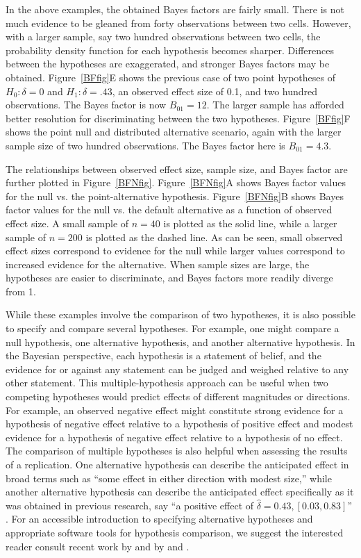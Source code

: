 \documentclass[man]{apa6}
\begin{document}
In the above examples, the obtained Bayes factors are fairly small. There is not much evidence to be gleaned from forty observations between two cells. However, with a larger sample, say two hundred observations between two cells, the probability density function for each hypothesis becomes sharper. Differences between the hypotheses are exaggerated, and stronger Bayes factors may be obtained. Figure~\ref{BFfig}E shows the previous case of two point hypotheses of $H_0: \delta = 0$ and $H_1: \delta = .43$, an observed effect size of 0.1, and two hundred observations. The Bayes factor is now $B_{01} = 12$. The larger sample has afforded better resolution for discriminating between the two hypotheses. Figure~\ref{BFfig}F shows the point null and distributed alternative scenario, again with the larger sample size of two hundred observations. The Bayes factor here is $B_{01} = 4.3$.

The relationships between observed effect size, sample size, and Bayes factor are further plotted in Figure~\ref{BFNfig}. Figure~\ref{BFNfig}A shows Bayes factor values for the null vs. the point-alternative hypothesis. Figure~\ref{BFNfig}B shows Bayes factor values for the null vs. the default alternative as a function of observed effect size. A small sample of $n=40$ is plotted as the solid line, while a larger sample of $n=200$ is plotted as the dashed line. As can be seen, small observed effect sizes correspond to evidence for the null while larger values correspond to increased evidence for the alternative. When sample sizes are large, the hypotheses are easier to discriminate, and Bayes factors more readily diverge from 1.  

While these examples involve the comparison of two hypotheses, it is also possible to specify and compare several hypotheses. For example, one might compare a null hypothesis, one alternative hypothesis, and another alternative hypothesis. In the Bayesian perspective, each hypothesis is a statement of belief, and the evidence for or against any statement can be judged and weighed relative to any other statement. 
This multiple-hypothesis approach can be useful when two competing hypotheses would predict effects of different magnitudes or directions. For example, an observed negative effect might constitute strong evidence for a hypothesis of negative effect relative to a hypothesis of positive effect and modest evidence for a hypothesis of negative effect relative to a hypothesis of no effect. The comparison of multiple hypotheses is also helpful when assessing the results of a replication. One alternative hypothesis can describe the anticipated effect in broad terms such as ``some effect in either direction with modest size,'' while another alternative hypothesis can describe the anticipated effect specifically as it was obtained in previous research, say ``a positive effect of $\hat{\delta} = 0.43, [0.03, 0.83]$'' \citep[see][for an example]{Boekel:etal:2014}. For an accessible introduction to specifying alternative hypotheses and appropriate software tools for hypothesis comparison, we suggest the interested reader consult recent work by \citet{Dienes:2011,Dienes:2014} and by \citet{Rouder:Morey:2012} and \citet{Rouder:etal:2012}.
\end{document}
